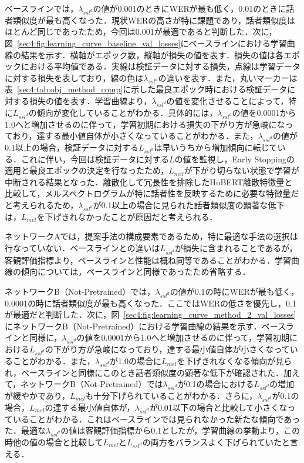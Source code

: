 \documentclass[12pt]{jarticle}
\numberwithin{equation}{section}    %
\numberwithin{figure}{section}      %
\numberwithin{table}{section}      %
\begin{document}
ベースラインでは，$\lambda_{ssl^{d}}$の値が0.001のときにWERが最も低く，0.01のときに話者類似度が最も高くなった．現状WERの高さが特に課題であり，話者類似度はほとんど同じであったため，今回は0.001が最適であると判断した．次に，図~\ref{sec4:fig:learning_curve_baseline_val_losses}にベースラインにおける学習曲線の結果を示す．横軸がエポック数，縦軸が損失の値を表す．損失の値は各エポックにおける平均値である．実線は検証データに対する損失，点線は学習データに対する損失を表しており，線の色は$\lambda_{ssl^{d}}$の違いを表す．また，丸いマーカーは表~\ref{sec4:tab:obj_method_comp}に示した最良エポック時における検証データに対する損失の値を表す．学習曲線より，$\lambda_{ssl^{d}}$の値を変化させることによって，特に$L_{ssl^{d}}$の傾向が変化していることがわかる．具体的には，$\lambda_{ssl^{d}}$の値を0.0001から1.0へと増加させるのに伴って，学習初期における損失の下がり方が急峻になっており，達する最小値自体が小さくなっていることがわかる．また，$\lambda_{ssl^{d}}$の値が0.1以上の場合，検証データに対する$L_{ssl^{d}}$は早いうちから増加傾向に転じている．これに伴い，今回は検証データに対する$L$の値を監視し，Early Stoppingの適用と最良エポックの決定を行なったため，$L_{mel}$が下がり切らない状態で学習が中断される結果となった．離散化して冗長性を排除したHuBERT離散特徴量と比較して，メルスペクトログラムが特に話者性を反映するために必要な特徴量だと考えられるため，$\lambda_{ssl^{d}}$が0.1以上の場合に見られた話者類似度の顕著な低下は，$L_{mel}$を下げきれなかったことが原因だと考えられる．

ネットワークAでは，提案手法の構成要素であるため，特に最適な手法の選択は行なっていない．ベースラインとの違いは$L_{ssl^{i}}$が損失に含まれることであるが，客観評価指標より，ベースラインと性能は概ね同等であることがわかる．学習曲線の傾向については，ベースラインと同様であったため省略する．

ネットワークB（Not-Pretrained）では，$\lambda_{ssl^{d}}$の値が0.1の時にWERが最も低く，0.0001の時に話者類似度が最も高くなった．ここではWERの低さを優先し，0.1が最適だと判断した．次に，図~\ref{sec4:fig:learning_curve_method_2_val_losses}にネットワークB（Not-Pretrained）における学習曲線の結果を示す．ベースラインと同様に，$\lambda_{ssl^{d}}$の値を0.0001から1.0へと増加させるのに伴って，学習初期における$L_{ssl^{d}}$の下がり方が急峻になっており，達する最小値自体が小さくなっていることがわかる．また，$\lambda_{ssl^{d}}$が1.0の場合に$L_{mel}$を下げきれなくなる傾向が見られ，ベースラインと同様にこのとき話者類似度の顕著な低下が確認された．加えて，ネットワークB（Not-Pretrained）では$\lambda_{ssl^{d}}$が0.1の場合における$L_{ssl^{d}}$の増加が緩やかであり，$L_{mel}$も十分下げられていることがわかる．さらに，$\lambda_{ssl^{d}}$が0.1の場合，$L_{mel}$の達する最小値自体が，$\lambda_{ssl^{d}}$が0.01以下の場合と比較して小さくなっていることがわかる．これはベースラインでは見られなかった新たな傾向であった．最適な$\lambda_{ssl^{d}}$の値は客観評価指標から0.1としたが，学習曲線の挙動より，この時他の値の場合と比較して$L_{mel}$と$L_{ssl^{d}}$の両方をバランスよく下げられていたと言える．
\end{document}
